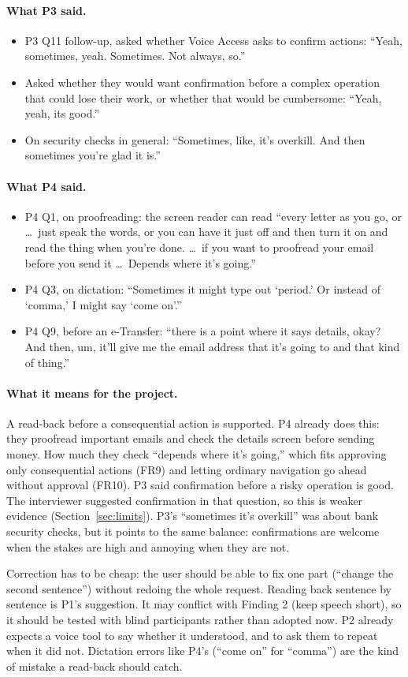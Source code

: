 \documentclass[12pt, titlepage]{article}
\newcommand{\saidthree}{\paragraph{What P3 said.}}
\newcommand{\saidfour}{\paragraph{What P4 said.}}
\newcommand{\means}{\paragraph{What it means for the project.}}
\begin{document}
\saidthree
\begin{itemize}
    \item P3 Q11 follow-up, asked whether Voice Access asks to confirm actions: ``Yeah, sometimes, yeah. Sometimes. Not always, so.''
    \item Asked whether they would want confirmation before a complex operation that could lose their work, or whether that would be cumbersome: ``Yeah, yeah, its good.''
    \item On security checks in general: ``Sometimes, like, it's overkill. And then sometimes you're glad it is.''
\end{itemize}

\saidfour
\begin{itemize}
    \item P4 Q1, on proofreading: the screen reader can read ``every letter as you go, or \ldots\ just speak the words, or you can have it just off and then turn it on and read the thing when you're done. \ldots\ if you want to proofread your email before you send it \ldots\ Depends where it's going.''
    \item P4 Q3, on dictation: ``Sometimes it might type out `period.' Or instead of `comma,' I might say `come on'.''
    \item P4 Q9, before an e-Transfer: ``there is a point where it says details, okay? And then, um, it'll give me the email address that it's going to and that kind of thing.''
\end{itemize}

\means
A read-back before a consequential action is supported. P4 already does this: they proofread important emails and check the details screen before sending money. How much they check ``depends where it's going,'' which fits approving only consequential actions (FR9) and letting ordinary navigation go ahead without approval (FR10). P3 said confirmation before a risky operation is good. The interviewer suggested confirmation in that question, so this is weaker evidence (Section~\ref{sec:limits}). P3's ``sometimes it's overkill'' was about bank security checks, but it points to the same balance: confirmations are welcome when the stakes are high and annoying when they are not.

Correction has to be cheap: the user should be able to fix one part (``change the second sentence'') without redoing the whole request. Reading back sentence by sentence is P1's suggestion. It may conflict with Finding 2 (keep speech short), so it should be tested with blind participants rather than adopted now. P2 already expects a voice tool to say whether it understood, and to ask them to repeat when it did not. Dictation errors like P4's (``come on'' for ``comma'') are the kind of mistake a read-back should catch.
\end{document}
